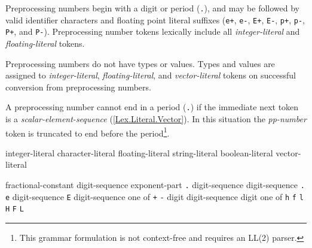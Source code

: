 \p Preprocessing numbers begin with a digit or period (\texttt{.}), and may be
followed by valid identifier characters and floating point literal suffixes
(\texttt{e+}, \texttt{e-}, \texttt{E+}, \texttt{E-}, \texttt{p+}, \texttt{p-},
\texttt{P+}, and \texttt{P-}). Preprocessing number tokens lexically include all
\textit{integer-literal} and \textit{floating-literal} tokens.

\p Preprocessing numbers do not have types or values. Types and values are
assigned to \textit{integer-literal}, \textit{floating-literal}, and
\textit{vector-literal} tokens on successful conversion from preprocessing
numbers.

\p A preprocessing number cannot end in a period (\texttt{.}) if the immediate
next token is a \textit{scalar-element-sequence} (\ref{Lex.Literal.Vector}). In
this situation the \textit{pp-number} token is truncated to end before the
period\footnote{This grammar formulation is not context-free and requires an
LL(2) parser.}.






\begin{grammar}
  \br
  integer-literal\br
  character-literal\br
  floating-literal\br
  string-literal\br
  boolean-literal\br
  vector-literal
\end{grammar}




\begin{grammar}
  \br
  fractional-constant  \br
  digit-sequence exponent-part \br
  \br
   \texttt{.} digit-sequence\br
  digit-sequence \texttt{.}\br
  \br
  \texttt{e}  digit-sequence\br
  \texttt{E}  digit-sequence\br
   \textnormal{one of}\br
  \texttt{+} \texttt{-}
  \br
  digit\br
  digit-sequence digit
   \textnormal{one of}
  \texttt{h} \texttt{f} \texttt{l} \texttt{H} \texttt{F} \texttt{L}
\end{grammar}

